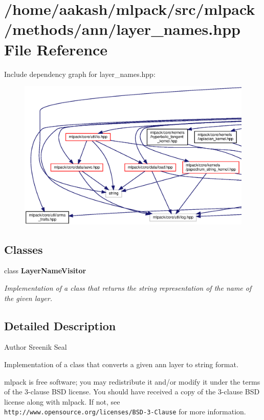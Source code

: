 \section{/home/aakash/mlpack/src/mlpack/methods/ann/layer\+\_\+names.hpp File Reference}
\label{layer__names_8hpp}
Include dependency graph for layer\+\_\+names.\+hpp\+:
\nopagebreak
\begin{figure}[H]
\begin{center}
\leavevmode
\includegraphics[width=350pt]{layer__names_8hpp__incl}
\end{center}
\end{figure}
\subsection*{Classes}
\begin{DoxyCompactItemize}
\item 
class \textbf{ Layer\+Name\+Visitor}
\begin{DoxyCompactList}\small\item\em Implementation of a class that returns the string representation of the name of the given layer. \end{DoxyCompactList}\end{DoxyCompactItemize}


\subsection{Detailed Description}
\begin{DoxyAuthor}{Author}
Sreenik Seal
\end{DoxyAuthor}
Implementation of a class that converts a given ann layer to string format.

mlpack is free software; you may redistribute it and/or modify it under the terms of the 3-\/clause B\+SD license. You should have received a copy of the 3-\/clause B\+SD license along with mlpack. If not, see {\tt http\+://www.\+opensource.\+org/licenses/\+B\+S\+D-\/3-\/\+Clause} for more information. 